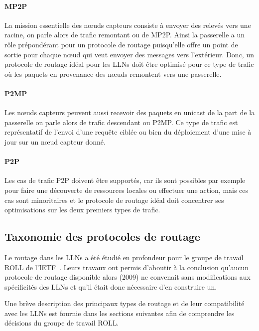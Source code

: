 \paragraph{\ac{MP2P}}

La mission essentielle des nœuds capteurs consiste à envoyer des relevés vers une racine, on parle alors de trafic remontant ou de \ac{MP2P}.
Ainsi la passerelle a un rôle prépondérant pour un protocole de routage puisqu'elle offre un  point de sortie pour chaque nœud qui veut envoyer des messages vers l'extérieur.
Donc, un protocole de routage idéal pour les \ac{LLN}s doit être optimisé pour ce type de trafic où les paquets en provenance des nœuds remontent vers une passerelle.

\paragraph{\ac{P2MP}}

Les nœuds capteurs peuvent aussi recevoir des paquets en unicast de la part de la passerelle on parle alors de trafic descendant ou \ac{P2MP}.
Ce type de trafic est représentatif de l'envoi d'une requête ciblée ou bien du déploiement d'une mise à jour sur un nœud capteur donné.

\paragraph{\ac{P2P}}

Les cas de trafic \ac{P2P} doivent être supportés, car ils sont possibles par exemple pour faire une découverte de ressources locales ou effectuer une action, mais ces cas sont minoritaires et le protocole de routage idéal doit concentrer ses optimisations sur les deux premiers types de trafic.

\subsection{Taxonomie des protocoles de routage}

Le routage dans les \ac{LLN}s a été étudié en profondeur pour le groupe de travail \ac{ROLL} de l'\ac{IETF}~\cite{draft-ietf-roll-protocols-survey-07}.
Leurs travaux ont permis d'aboutir à la conclusion qu'aucun protocole de routage disponible alors (2009) ne convenait sans modifications aux spécificités des \ac{LLN}s et qu'il était donc nécessaire d'en construire un.

Une brève description des principaux types de routage et de leur compatibilité avec les \ac{LLN}s est fournie dans les sections suivantes afin de comprendre les décisions du groupe de travail \ac{ROLL}.

